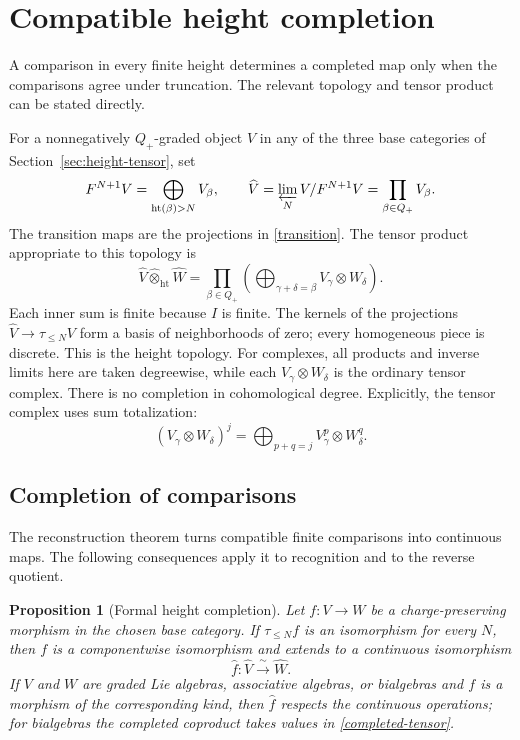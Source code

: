 \documentclass[11pt]{article}
\newtheorem{proposition}[theorem]{Proposition}
\newcommand{\htop}{\operatorname{ht}}
\begin{document}
\section{Compatible height completion}

A comparison in every finite height determines a completed map only
when the comparisons agree under truncation.
The relevant topology and tensor product can be stated directly.

For a nonnegatively $Q_+$-graded object $V$ in any of the three base
categories of Section~\ref{sec:height-tensor}, set
\[
 F^{N+1}V=\bigoplus_{\htop(\beta)>N}V_\beta,\qquad
 \widehat V=\varprojlim_N V/F^{N+1}V
            =\prod_{\beta\in Q_+}V_\beta.
\]
The transition maps are the projections in \eqref{transition}.  The tensor
product appropriate to this topology is
\begin{equation}
 \widehat V\mathbin{\widehat\otimes_{\mathrm{ht}}}\widehat W
 =
 \prod_{\beta\in Q_+}
 \left(\bigoplus_{\gamma+\delta=\beta}
 V_\gamma\otimes W_\delta\right).                            \label{completed-tensor}
\end{equation}
Each inner sum is finite because $I$ is finite.
The kernels of the projections $\widehat V\to\tau_{\leq N}V$ form a
basis of neighborhoods of zero; every homogeneous piece is discrete.
This is the height topology. For complexes, all products and inverse
limits here are taken degreewise, while each $V_\gamma\otimes W_\delta$
is the ordinary tensor complex. There is no completion in cohomological
degree. Explicitly, the tensor complex uses sum totalization:
\[
 (V_\gamma\otimes W_\delta)^j
 =\bigoplus_{p+q=j}V_\gamma^p\otimes W_\delta^q.
\]



\subsection{Completion of comparisons}

The reconstruction theorem turns compatible finite comparisons into
continuous maps. The following consequences apply it to recognition and
to the reverse quotient.

\begin{proposition}[Formal height completion]                 \label{completion}
Let $f:V\to W$ be a charge-preserving morphism in the chosen base
category. If
$\tau_{\leq N}f$ is an isomorphism for every $N$, then $f$ is a
componentwise isomorphism and extends to a continuous isomorphism
\[
 \widehat f:\widehat V\xrightarrow{\ \sim\ }\widehat W.
\]
If $V$ and $W$ are graded Lie algebras, associative algebras, or bialgebras
and $f$ is a morphism of the corresponding kind, then $\widehat f$ respects
the continuous operations; for bialgebras the completed coproduct takes
values in \eqref{completed-tensor}.
\end{proposition}
\end{document}
